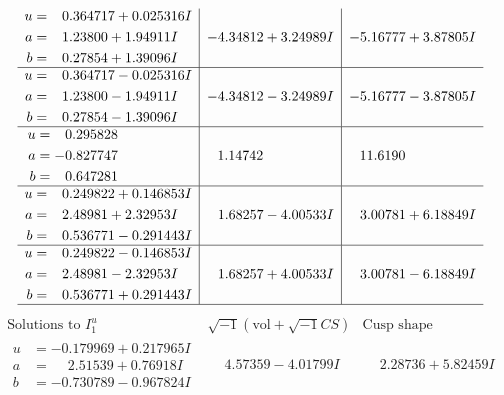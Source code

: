 \documentclass[1p]{elsarticle_modified}
\theoremstyle{definition}
\newcommand{\I}{\sqrt{-1}}
\begin{document}
$$\begin{array}{c|c|c}
\begin{aligned}
u &= \phantom{-}0.364717 + 0.025316 I \\
a &= \phantom{-}1.23800 + 1.94911 I \\
b &= \phantom{-}0.27854 + 1.39096 I\end{aligned}
 & -4.34812 + 3.24989 I & -5.16777 + 3.87805 I \\ \hline\begin{aligned}
u &= \phantom{-}0.364717 - 0.025316 I \\
a &= \phantom{-}1.23800 - 1.94911 I \\
b &= \phantom{-}0.27854 - 1.39096 I\end{aligned}
 & -4.34812 - 3.24989 I & -5.16777 - 3.87805 I \\ \hline\begin{aligned}
u &= \phantom{-}0.295828\phantom{ +0.000000I} \\
a &= -0.827747\phantom{ +0.000000I} \\
b &= \phantom{-}0.647281\phantom{ +0.000000I}\end{aligned}
 & \phantom{-}1.14742\phantom{ +0.000000I} & \phantom{-}11.6190\phantom{ +0.000000I} \\ \hline\begin{aligned}
u &= \phantom{-}0.249822 + 0.146853 I \\
a &= \phantom{-}2.48981 + 2.32953 I \\
b &= \phantom{-}0.536771 - 0.291443 I\end{aligned}
 & \phantom{-}1.68257 - 4.00533 I & \phantom{-}3.00781 + 6.18849 I \\ \hline\begin{aligned}
u &= \phantom{-}0.249822 - 0.146853 I \\
a &= \phantom{-}2.48981 - 2.32953 I \\
b &= \phantom{-}0.536771 + 0.291443 I\end{aligned}
 & \phantom{-}1.68257 + 4.00533 I & \phantom{-}3.00781 - 6.18849 I\\
 \hline 
 \end{array}$$\newpage$$\begin{array}{c|c|c}  
\text{Solutions to }I^u_{1}& \I (\text{vol} + \sqrt{-1}CS) & \text{Cusp shape}\\
 \hline 
\begin{aligned}
u &= -0.179969 + 0.217965 I \\
a &= \phantom{-}2.51539 + 0.76918 I \\
b &= -0.730789 - 0.967824 I\end{aligned}
 & \phantom{-}4.57359 - 4.01799 I & \phantom{-}2.28736 + 5.82459 I \\ \hline\begin{aligned}

\end{aligned}
\end{array}$$
\end{document}
